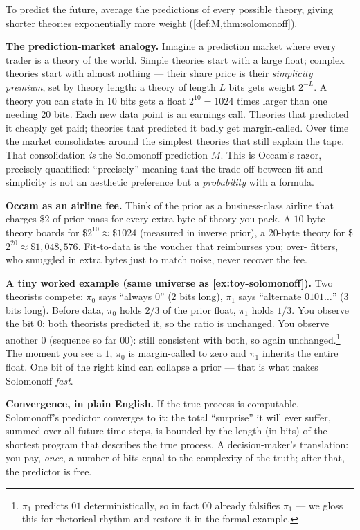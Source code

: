 \begin{intuition}
To predict the future, average the predictions of every possible
theory, giving shorter theories exponentially more weight
(\cref{def:M,thm:solomonoff}).

\textbf{The prediction-market analogy.}  Imagine a prediction market
where every trader is a theory of the world.  Simple theories start
with a large float; complex theories start with almost nothing ---
their share price is their \emph{simplicity premium}, set by theory
length: a theory of length $L$ bits gets weight $2^{-L}$.  A theory
you can state in $10$ bits gets a float $2^{10}=1024$ times larger
than one needing $20$ bits.  Each new data point is an earnings call.
Theories that predicted it cheaply get paid; theories that predicted
it badly get margin-called.  Over time the market consolidates around
the simplest theories that still explain the tape.  That
consolidation \emph{is} the Solomonoff prediction $M$.  This is
Occam's razor, precisely quantified: ``precisely'' meaning that the
trade-off between fit and simplicity is not an aesthetic preference
but a \emph{probability} with a formula.

\textbf{Occam as an airline fee.}  Think of the prior as a
business-class airline that charges \$2 of prior mass for every extra
byte of theory you pack.  A $10$-byte theory boards for
\$$2^{10}\!\approx\!\$1024$ (measured in inverse prior), a $20$-byte
theory for \$$2^{20}\!\approx\!\$1{,}048{,}576$.  Fit-to-data is the
voucher that reimburses you; over- fitters, who smuggled in extra
bytes just to match noise, never recover the fee.

\textbf{A tiny worked example (same universe as \cref{ex:toy-solomonoff}).}
Two theorists compete: $\pi_0$ says ``always $0$'' ($2$ bits long),
$\pi_1$ says ``alternate $0101\dots$'' ($3$ bits long).  Before data,
$\pi_0$ holds $2/3$ of the prior float, $\pi_1$ holds $1/3$.  You
observe the bit $0$: both theorists predicted it, so the ratio is
unchanged.  You observe another $0$ (sequence so far $00$): still
consistent with both, so again unchanged.\footnote{$\pi_1$ predicts
$01$ deterministically, so in fact $00$ already falsifies $\pi_1$ ---
we gloss this for rhetorical rhythm and restore it in the formal
example.}  The moment you see a $1$, $\pi_0$ is margin-called to
zero and $\pi_1$ inherits the entire float.  One bit of the right
kind can collapse a prior --- that is what makes Solomonoff
\emph{fast}.

\textbf{Convergence, in plain English.}  If the true process is
computable, Solomonoff's predictor converges to it: the total
``surprise'' it will ever suffer, summed over all future time steps,
is bounded by the length (in bits) of the shortest program that
describes the true process.  A decision-maker's translation: you pay,
\emph{once}, a number of bits equal to the complexity of the truth;
after that, the predictor is free.


\end{intuition}
